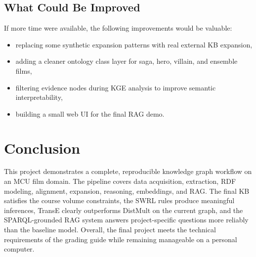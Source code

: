 \documentclass[11pt,a4paper]{article}
\begin{document}
\subsection{What Could Be Improved}
If more time were available, the following improvements would be valuable:
\begin{itemize}
  \item replacing some synthetic expansion patterns with real external KB expansion,
  \item adding a cleaner ontology class layer for saga, hero, villain, and ensemble films,
  \item filtering evidence nodes during KGE analysis to improve semantic interpretability,
  \item building a small web UI for the final RAG demo.
\end{itemize}

\section{Conclusion}
This project demonstrates a complete, reproducible knowledge graph workflow on an MCU film domain. The pipeline covers data acquisition, extraction, RDF modeling, alignment, expansion, reasoning, embeddings, and RAG. The final KB satisfies the course volume constraints, the SWRL rules produce meaningful inferences, TransE clearly outperforms DistMult on the current graph, and the SPARQL-grounded RAG system answers project-specific questions more reliably than the baseline model. Overall, the final project meets the technical requirements of the grading guide while remaining manageable on a personal computer.
\end{document}
